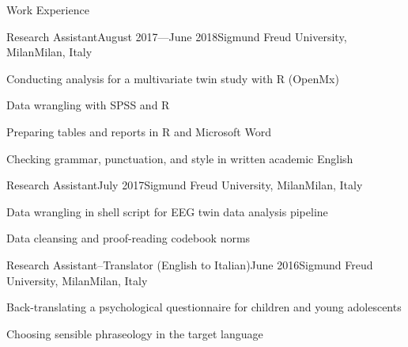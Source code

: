 \documentclass{resume2} %
\begin{document}
\begin{rSection}{Work Experience}



\begin{rSubsection}{Research Assistant}{August 2017---June 2018}{Sigmund Freud University, Milan}{Milan, Italy}
\item Conducting analysis for a multivariate twin study with R (OpenMx)
\item Data wrangling with SPSS and R%
\item Preparing tables and reports in R and Microsoft Word
\item Checking grammar, punctuation, and style in written academic English
\end{rSubsection}

\begin{rSubsection}{Research Assistant}{July 2017}{Sigmund Freud University, Milan}{Milan, Italy}
\item Data wrangling in shell script for EEG twin data analysis pipeline
\item Data cleansing and proof-reading codebook norms
\end{rSubsection}

\begin{rSubsection}{Research Assistant--Translator (English to Italian)}{June 2016}{Sigmund Freud University, Milan}{Milan, Italy}
\item Back-translating a psychological questionnaire for children and young adolescents
\item Choosing sensible phraseology in the target language
\end{rSubsection}

\end{rSection}

\end{document}
